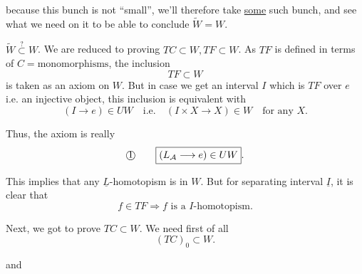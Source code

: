 
because this bunch is not ``small'', we'll therefore take \uline{some} such bunch, and see what we need on it to be able to conclude $\widetilde W=W$.

$\widetilde W\overset{?}{\subset}W$. We are reduced to proving $TC\subset W,TF\subset W$. As $TF$ is defined in terms of $C=\text{monomorphisms}$, the inclusion
\[
\boxed{TF\subset W}
\]
is taken as an axiom on $W$. But in case we get an  interval $I$ which is $TF$ over $e$ i.e. an injective object,  this inclusion is equivalent with
\[
\boxed{(I\longrightarrow e)\in UW\quad\text{i.e.}\quad(I\times X\longrightarrow X)\in W\quad\text{for any }X}.
\]

Thus, the axiom is really
\[
\text{\textcircled{1}}\qquad\boxed{(L_{\mathcal A}\longrightarrow e)\in UW}.
\]

This implies that any $\underline L$-homotopism is in $W$.
But for  separating interval $\underline I$, it is clear that
\[
f\in TF\Longrightarrow f\text{ is a }I\text{-homotopism}.
\]

Next, we got to prove $TC\subset W$. We need first of all
\[
(TC)_0\subset W.
\]

and

